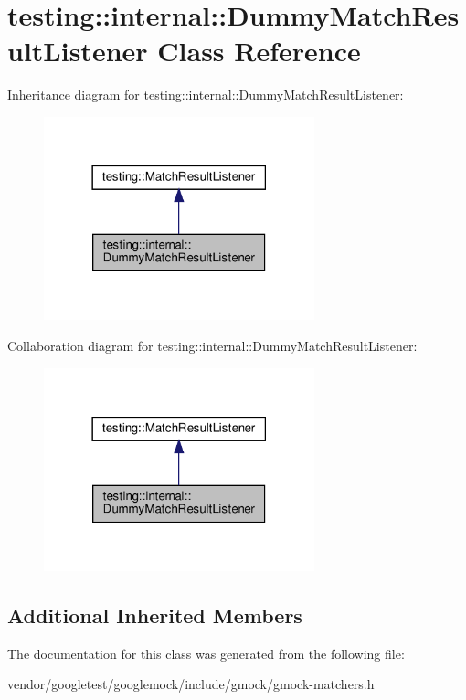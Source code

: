 \hypertarget{classtesting_1_1internal_1_1_dummy_match_result_listener}{}\section{testing\+:\+:internal\+:\+:Dummy\+Match\+Result\+Listener Class Reference}
\label{classtesting_1_1internal_1_1_dummy_match_result_listener}


Inheritance diagram for testing\+:\+:internal\+:\+:Dummy\+Match\+Result\+Listener\+:
\nopagebreak
\begin{figure}[H]
\begin{center}
\leavevmode
\includegraphics[width=222pt]{classtesting_1_1internal_1_1_dummy_match_result_listener__inherit__graph}
\end{center}
\end{figure}


Collaboration diagram for testing\+:\+:internal\+:\+:Dummy\+Match\+Result\+Listener\+:
\nopagebreak
\begin{figure}[H]
\begin{center}
\leavevmode
\includegraphics[width=222pt]{classtesting_1_1internal_1_1_dummy_match_result_listener__coll__graph}
\end{center}
\end{figure}
\subsection*{Additional Inherited Members}


The documentation for this class was generated from the following file\+:\begin{DoxyCompactItemize}
\item 
vendor/googletest/googlemock/include/gmock/gmock-\/matchers.\+h\end{DoxyCompactItemize}
